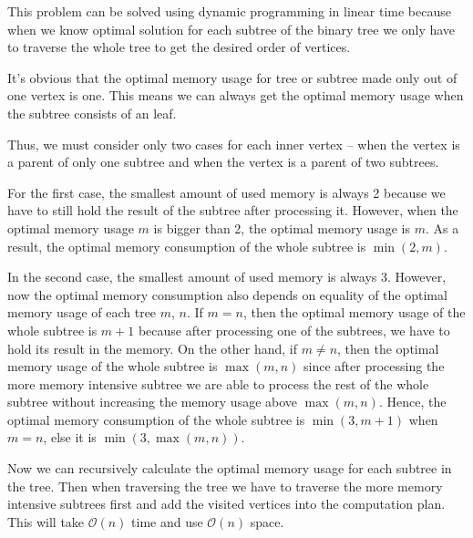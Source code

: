 \documentclass{fkssolpub}
\author{Ondřej Sedláček}
\begin{document}
 

This problem can be solved using dynamic programming in linear time
because when we know optimal solution for each subtree of the binary
tree we only have to traverse the whole tree to get the desired order
of vertices.

It's obvious that the optimal memory usage for tree or subtree made
only out of one vertex is one. This means we can always get the optimal
memory usage when the subtree consists of an leaf. 

Thus, we must consider only two cases for each inner vertex -- when the 
vertex is a parent of only one subtree and when the vertex is a parent 
of two subtrees. 

For the first case, the smallest amount of used 
memory is always 2 because we have to still hold the result of the
subtree after processing it. However, when the optimal memory usage $m$ is
bigger than 2, the optimal memory usage is $m$. As a result, the optimal
memory consumption of the whole subtree is $\min(2, m)$.

In the second case, the smallest amount of used memory is always 3.
However, now the optimal memory consumption also depends on equality
of the optimal memory usage of each tree $m$, $n$. If $m = n$, then
the optimal memory usage of the whole subtree is $m + 1$ because
after processing one of the subtrees, we have to hold its result in the
memory. On the other hand, if $m \neq n$, then the optimal memory usage 
of the whole subtree is $\max(m,n)$ since after processing the more
memory intensive subtree we are able to process the rest of the whole subtree
without increasing the memory usage above $\max(m,n)$. Hence, the optimal
memory consumption of the whole subtree is $\min(3, m + 1)$ when $m = n$,
else it is $\min(3, \max(m,n))$.

Now we can recursively calculate the optimal memory usage for each subtree
in the tree. Then when traversing the tree we have to traverse the more
memory intensive subtrees first and add the visited vertices into the
computation plan. This will take $\mathcal{O}(n)$ time and use $\mathcal{O}(n)$
space.
\end{document}
